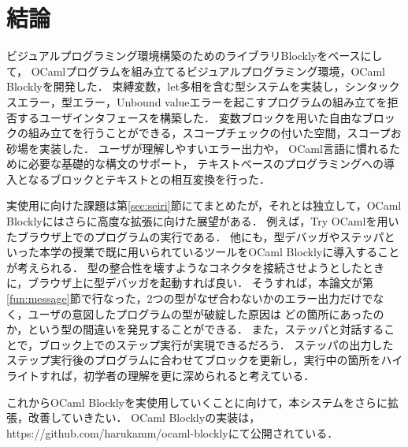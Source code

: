 \chapter {結論}\label{chap:conclusion}

ビジュアルプログラミング環境構築のためのライブラリBlocklyをベースにして，
OCamlプログラムを組み立てるビジュアルプログラミング環境，OCaml Blocklyを開発した．
束縛変数，let多相を含む型システムを実装し，シンタックスエラー，型エラー，Unbound valueエラーを起こすプログラムの組み立てを拒否するユーザインタフェースを構築した．
変数ブロックを用いた自由なブロックの組み立てを行うことができる，スコープチェックの付いた空間，スコープお砂場を実装した．
ユーザが理解しやすいエラー出力や，
OCaml言語に慣れるために必要な基礎的な構文のサポート，
テキストベースのプログラミングへの導入となるブロックとテキストとの相互変換を行った．

実使用に向けた課題は第\ref{sec:seiri}節にてまとめたが，それとは独立して，OCaml Blocklyにはさらに高度な拡張に向けた展望がある．
例えば，Try OCamlを用いたブラウザ上でのプログラムの実行である．
他にも，型デバッガ\cite{10.1007/978-3-642-41582-1_12}やステッパ\cite{Stepper}といった本学の授業で既に用いられているツールをOCaml Blocklyに導入することが考えられる．
型の整合性を壊すようなコネクタを接続させようとしたときに，ブラウザ上に型デバッガを起動すれば良い．
そうすれば，本論文が第\ref{fun:message}節で行なった，2つの型がなぜ合わないかのエラー出力だけでなく，ユーザの意図したプログラムの型が破綻した原因は
どの箇所にあったのか，という型の間違いを発見することができる．
また，ステッパと対話することで，ブロック上でのステップ実行が実現できるだろう．
ステッパの出力したステップ実行後のプログラムに合わせてブロックを更新し，実行中の箇所をハイライトすれば，初学者の理解を更に深められると考えている．
 

これからOCaml Blocklyを実使用していくことに向けて，本システムをさらに拡張，改善していきたい．
OCaml Blocklyの実装は，https://github.com/harukamm/ocaml-blocklyにて公開されている．
